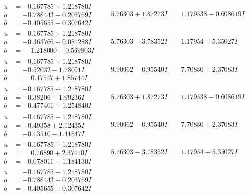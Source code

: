 \documentclass[1p]{elsarticle_modified}
\theoremstyle{definition}
\begin{document}
$$\begin{array}{c|c|c}
\begin{aligned}
u &= -0.167785 + 1.218780 I \\
a &= -0.788443 - 0.203769 I \\
b &= -0.405655 - 0.307642 I\end{aligned}
 & \phantom{-}5.76303 + 1.87273 I & \phantom{-}1.179538 - 0.608619 I \\ \hline\begin{aligned}
u &= -0.167785 + 1.218780 I \\
a &= -0.363766 + 0.081288 I \\
b &= \phantom{-}1.218000 + 0.569803 I\end{aligned}
 & \phantom{-}5.76303 - 3.78352 I & \phantom{-}1.17954 + 5.35027 I \\ \hline\begin{aligned}
u &= -0.167785 + 1.218780 I \\
a &= -0.52032 - 1.78091 I \\
b &= \phantom{-}0.47547 + 1.85744 I\end{aligned}
 & \phantom{-}9.90062 - 0.95540 I & \phantom{-}7.70880 + 2.37083 I \\ \hline\begin{aligned}
u &= -0.167785 + 1.218780 I \\
a &= -0.38206 - 1.99236 I \\
b &= -0.477401 + 1.254840 I\end{aligned}
 & \phantom{-}5.76303 + 1.87273 I & \phantom{-}1.179538 - 0.608619 I \\ \hline\begin{aligned}
u &= -0.167785 + 1.218780 I \\
a &= -0.49358 + 2.12435 I \\
b &= -0.13510 - 1.41647 I\end{aligned}
 & \phantom{-}9.90062 - 0.95540 I & \phantom{-}7.70880 + 2.37083 I \\ \hline\begin{aligned}
u &= -0.167785 + 1.218780 I \\
a &= \phantom{-}0.76890 + 2.37410 I \\
b &= -0.078011 - 1.184130 I\end{aligned}
 & \phantom{-}5.76303 - 3.78352 I & \phantom{-}1.17954 + 5.35027 I \\ \hline\begin{aligned}
u &= -0.167785 - 1.218780 I \\
a &= -0.788443 + 0.203769 I \\
b &= -0.405655 + 0.307642 I\end{aligned}

\end{array}$$
\end{document}
